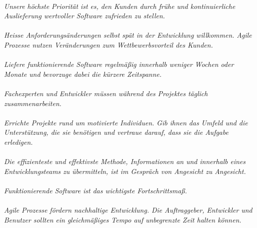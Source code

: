 \documentclass{article}
\begin{document}
{
\centering
\paragraph{}
\textit{Unsere höchste Priorität ist es, den Kunden durch frühe und kontinuierliche Auslieferung wertvoller Software zufrieden zu stellen.}

\paragraph{}
\textit{Heisse Anforderungsänderungen selbst spät in der Entwicklung willkommen. Agile Prozesse nutzen Veränderungen zum Wettbewerbsvorteil des Kunden.}

\paragraph{}
\textit{Liefere funktionierende Software regelmäßig innerhalb weniger Wochen oder Monate und bevorzuge dabei die kürzere Zeitspanne.}

\paragraph{}
\textit{Fachexperten und Entwickler müssen während des Projektes täglich zusammenarbeiten.}

\paragraph{}
\textit{Errichte Projekte rund um motivierte Individuen. Gib ihnen das Umfeld und die Unterstützung, die sie benötigen und vertraue darauf, dass sie die Aufgabe erledigen.}

\paragraph{}
\textit{Die effizienteste und effektivste Methode, Informationen an und innerhalb eines Entwicklungsteams zu übermitteln, ist im Gespräch von Angesicht zu Angesicht.}

\paragraph{}
\textit{Funktionierende Software ist das wichtigste Fortschrittsmaß.}

\paragraph{}
\textit{Agile Prozesse fördern nachhaltige Entwicklung. Die Auftraggeber, Entwickler und Benutzer sollten ein gleichmäßiges Tempo auf unbegrenzte Zeit halten können.}

}
\end{document}
